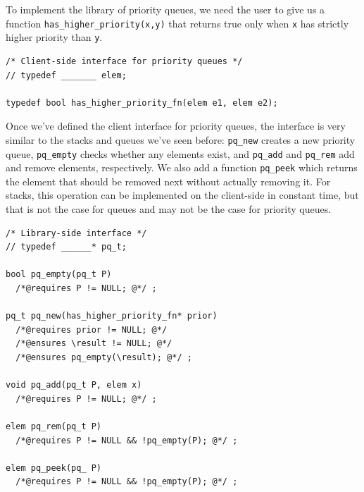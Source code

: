 \clearpage
To implement the library of priority queues, we need the user
to give us a function \lstinline'has_higher_priority(x,y)' that returns true
only when \lstinline'x' has strictly higher priority than \lstinline'y'.

\begin{lstlisting}[language={[C0]C}]
/* Client-side interface for priority queues */
// typedef _______ elem;

typedef bool has_higher_priority_fn(elem e1, elem e2);
\end{lstlisting}

Once we've defined the client interface for priority queues, the interface is
very similar to the stacks and queues we've seen before: \lstinline'pq_new'
creates a new priority queue, \lstinline'pq_empty' checks whether any elements
exist, and \lstinline'pq_add' and \lstinline'pq_rem' add and remove elements,
respectively. We also add a function \lstinline'pq_peek' which returns the
element that should be removed next without actually removing it. For stacks,
this operation can be implemented on the client-side in constant time, but
that is not the case for queues and may not be the case for priority queues.




\begin{lstlisting}[language={[C0]C}]
/* Library-side interface */
// typedef ______* pq_t;

bool pq_empty(pq_t P)
  /*@requires P != NULL; @*/ ;

pq_t pq_new(has_higher_priority_fn* prior)
  /*@requires prior != NULL; @*/
  /*@ensures \result != NULL; @*/
  /*@ensures pq_empty(\result); @*/ ;

void pq_add(pq_t P, elem x)
  /*@requires P != NULL; @*/ ;

elem pq_rem(pq_t P)
  /*@requires P != NULL && !pq_empty(P); @*/ ;

elem pq_peek(pq_ P)
  /*@requires P != NULL && !pq_empty(P); @*/ ;
\end{lstlisting}

